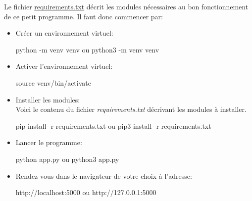 \documentclass[a4paper,11pt]{article}
\begin{document}
            \bigskip
            \noindent Le fichier \underline{requirements.txt} décrit les modules nécessaires au bon fonctionnement de ce petit programme.
            Il faut donc commencer par: 
            \begin{itemize}
                \item Créer un environnement virtuel: 
                    \begin{tcolorbox}[colback=lightgray!6, colframe=black, left=5mm, right=5mm, top=2mm, bottom=2mm, boxrule=0.1mm]
                        python -m venv venv ou python3 -m venv venv
                    \end{tcolorbox}

                \item Activer l'environnement virtuel: 
                    \begin{tcolorbox}[colback=lightgray!6, colframe=black, left=5mm, right=5mm, top=2mm, bottom=2mm, boxrule=0.1mm]
                        source venv/bin/activate
                    \end{tcolorbox}

                \item Installer les modules: \\ 
                    \noindent Voici le contenu du fichier \textit{requirements.txt} décrivant les modules à installer.
                    
                    \begin{tcolorbox}[colback=lightgray!6, colframe=black, left=5mm, right=5mm, top=2mm, bottom=2mm, boxrule=0.1mm]
                        pip install -r requirements.txt ou pip3 install -r requirements.txt
                    \end{tcolorbox}

                \item Lancer le programme: 
                    \begin{tcolorbox}[colback=lightgray!6, colframe=black, left=5mm, right=5mm, top=2mm, bottom=2mm, boxrule=0.1mm]
                        python app.py ou python3 app.py
                    \end{tcolorbox}

                \item Rendez-vous dans le navigateur de votre choix à l'adresse: 
                    \begin{tcolorbox}[colback=lightgray!6, colframe=black, left=5mm, right=5mm, top=2mm, bottom=2mm, boxrule=0.1mm]
                        http://localhost:5000 ou http://127.0.0.1:5000
                    \end{tcolorbox}
            \end{itemize}
\end{document}

